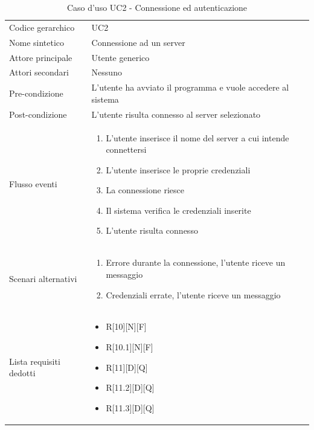 \documentclass[a4paper]{report}
\begin{document}
			\begin{table}[H]
			\begin{tabularx}{\textwidth}{X | X}\toprule
				\rowcolor{orange!65}Codice gerarchico & UC2 \\
				Nome sintetico & Connessione ad un server \\
				\rowcolor{orange!65}Attore principale & Utente generico\\
				Attori secondari & Nessuno \\
				\rowcolor{orange!65}Pre-condizione & L'utente ha avviato il programma e vuole accedere al
				 sistema\\
				Post-condizione & L'utente risulta connesso al server selezionato \\
				\rowcolor{orange!65}Flusso eventi & \begin{enumerate}
				\item L'utente inserisce il nome del server a cui intende connettersi
				\item L'utente inserisce le proprie credenziali
				\item La connessione riesce
				\item Il sistema verifica le credenziali inserite
				\item L'utente risulta connesso
				\end{enumerate} \\
				Scenari alternativi & \begin{enumerate}
				\item Errore durante la connessione, l'utente riceve un messaggio
				\item Credenziali errate, l'utente riceve un messaggio
				\end{enumerate} \\
				\rowcolor{orange!65}Lista requisiti dedotti & \begin{itemize}
				\item R[10][N][F]
				\item R[10.1][N][F]
				\item R[11][D][Q]
				\item R[11.2][D][Q]
				\item R[11.3][D][Q]
				\end{itemize} \\
				\bottomrule
			\end{tabularx}
			\caption{Caso d'uso UC2 - Connessione ed autenticazione}
		 \end{table}
\end{document}
